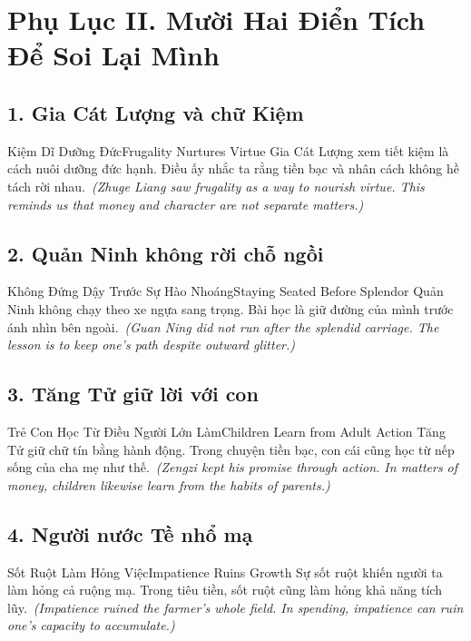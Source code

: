 \chapter*{Phụ Lục II. Mười Hai Điển Tích Để Soi Lại Mình}

\section*{1. Gia Cát Lượng và chữ Kiệm}
\begin{truyen}{Kiệm Dĩ Dưỡng Đức}{Frugality Nurtures Virtue}
Gia Cát Lượng xem tiết kiệm là cách nuôi dưỡng đức hạnh. Điều ấy nhắc ta rằng tiền bạc và nhân cách không hề tách rời nhau.\
\textit{(Zhuge Liang saw frugality as a way to nourish virtue. This reminds us that money and character are not separate matters.)}
\end{truyen}

\section*{2. Quản Ninh không rời chỗ ngồi}
\begin{truyen}{Không Đứng Dậy Trước Sự Hào Nhoáng}{Staying Seated Before Splendor}
Quản Ninh không chạy theo xe ngựa sang trọng. Bài học là giữ đường của mình trước ánh nhìn bên ngoài.\
\textit{(Guan Ning did not run after the splendid carriage. The lesson is to keep one’s path despite outward glitter.)}
\end{truyen}

\section*{3. Tăng Tử giữ lời với con}
\begin{truyen}{Trẻ Con Học Từ Điều Người Lớn Làm}{Children Learn from Adult Action}
Tăng Tử giữ chữ tín bằng hành động. Trong chuyện tiền bạc, con cái cũng học từ nếp sống của cha mẹ như thế.\
\textit{(Zengzi kept his promise through action. In matters of money, children likewise learn from the habits of parents.)}
\end{truyen}

\section*{4. Người nước Tề nhổ mạ}
\begin{truyen}{Sốt Ruột Làm Hỏng Việc}{Impatience Ruins Growth}
Sự sốt ruột khiến người ta làm hỏng cả ruộng mạ. Trong tiêu tiền, sốt ruột cũng làm hỏng khả năng tích lũy.\
\textit{(Impatience ruined the farmer’s whole field. In spending, impatience can ruin one’s capacity to accumulate.)}
\end{truyen}


